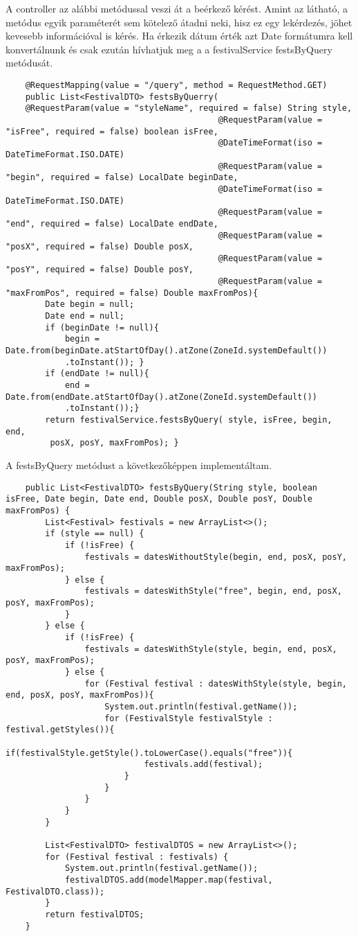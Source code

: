 A controller az alábbi metódussal veszi át a beérkező kérést. Amint az látható, a metódus egyik paraméterét sem kötelező átadni neki, hisz ez egy lekérdezés, jöhet kevesebb információval is kérés. Ha érkezik dátum érték azt Date formátumra kell konvertálnunk és csak ezután hívhatjuk meg a a festivalService festsByQuery metódusát.

\begin{verbatim}
	@RequestMapping(value = "/query", method = RequestMethod.GET)
	public List<FestivalDTO> festsByQuerry(
	@RequestParam(value = "styleName", required = false) String style,
										   @RequestParam(value = "isFree", required = false) boolean isFree,
										   @DateTimeFormat(iso = DateTimeFormat.ISO.DATE) 
										   @RequestParam(value = "begin", required = false) LocalDate beginDate,
										   @DateTimeFormat(iso = DateTimeFormat.ISO.DATE) 
										   @RequestParam(value = "end", required = false) LocalDate endDate,
										   @RequestParam(value = "posX", required = false) Double posX,
										   @RequestParam(value = "posY", required = false) Double posY,
										   @RequestParam(value = "maxFromPos", required = false) Double maxFromPos){
		Date begin = null;
		Date end = null;
		if (beginDate != null){
			begin = Date.from(beginDate.atStartOfDay().atZone(ZoneId.systemDefault())
			.toInstant()); }
		if (endDate != null){
			end = Date.from(endDate.atStartOfDay().atZone(ZoneId.systemDefault())
			.toInstant());}
		return festivalService.festsByQuery( style, isFree, begin, end,
		 posX, posY, maxFromPos); }
\end{verbatim}

A festsByQuery metódust a következőképpen implementáltam.

\begin{verbatim}
    public List<FestivalDTO> festsByQuery(String style, boolean isFree, Date begin, Date end, Double posX, Double posY, Double maxFromPos) {
        List<Festival> festivals = new ArrayList<>();
        if (style == null) {
            if (!isFree) {
                festivals = datesWithoutStyle(begin, end, posX, posY, maxFromPos);
            } else {
                festivals = datesWithStyle("free", begin, end, posX, posY, maxFromPos);
            }
        } else {
            if (!isFree) {
                festivals = datesWithStyle(style, begin, end, posX, posY, maxFromPos);
            } else {
                for (Festival festival : datesWithStyle(style, begin, end, posX, posY, maxFromPos)){
                    System.out.println(festival.getName());
                    for (FestivalStyle festivalStyle : festival.getStyles()){
                        if(festivalStyle.getStyle().toLowerCase().equals("free")){
                            festivals.add(festival);
                        }
                    }
                }
            }
        }

        List<FestivalDTO> festivalDTOS = new ArrayList<>();
        for (Festival festival : festivals) {
            System.out.println(festival.getName());
            festivalDTOS.add(modelMapper.map(festival, FestivalDTO.class));
        }
        return festivalDTOS;
    }
\end{verbatim}